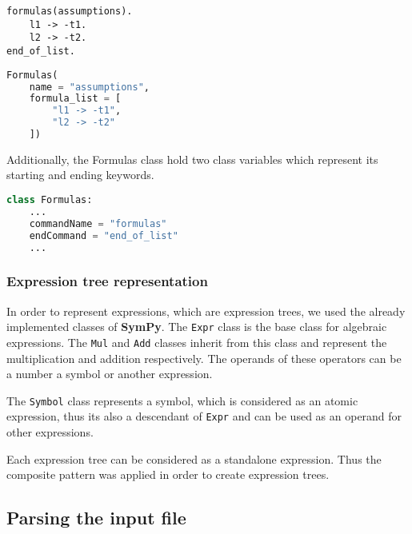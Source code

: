 \begin{multicols}{2}

\begin{lstlisting}[title=Mace4 formulas]
formulas(assumptions).
    l1 -> -t1.
    l2 -> -t2.
end_of_list.
\end{lstlisting}

\columnbreak

\begin{lstlisting}[language=Python, title=Formulas object creation]
Formulas(
    name = "assumptions", 
    formula_list = [
        "l1 -> -t1",
        "l2 -> -t2"
    ])
\end{lstlisting}

\end{multicols}

Additionally, the Formulas class hold two class variables which represent its starting and ending keywords.

\begin{lstlisting}[language=Python, numbers=none, title=Formulas class variables]
class Formulas:
    ...
    commandName = "formulas"
    endCommand = "end_of_list"
    ...
\end{lstlisting}

\subsubsection{Expression tree representation}
\label{sec:rep_expr}

In order to represent expressions, which are expression trees, we used the already implemented classes of \textbf{SymPy}. The \verb|Expr| class is the base class for algebraic expressions. The \verb|Mul| and \verb|Add| classes inherit from this class and represent the multiplication and addition respectively. The operands of these operators can be a number a symbol or another expression.

The \verb|Symbol| class represents a symbol, which is considered as an atomic expression, thus its also a descendant of \verb|Expr| and can be used as an operand for other expressions.

Each expression tree can be considered as a standalone expression. Thus the composite pattern was applied in order to create expression trees.





\subsection{Parsing the input file}

